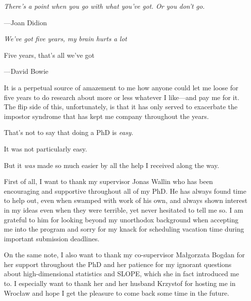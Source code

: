 \documentclass{book}
\begin{document}
\pagestyle{empty}


\cleardoublepage



\newpage
\thispagestyle{empty} %

\setlength\epigraphrule{0pt}
\setlength{}

\null
\vspace{20ex}

\epigraph{\itshape
  There’s a point when you go with what you’ve got. Or you don’t go.
}{
  ---Joan Didion
}

\cleardoublepage
\pagestyle{fancy}
\setcounter{page}{1}
\setcounter{tocdepth}{1}

{\hypersetup{hidelinks}\tableofcontents}

\newpage
{}

\epigraph{\itshape
  We've got five years, my brain hurts a lot

  Five years, that's all we've got
}{
  ---David Bowie
}

\noindent It is a perpetual source of amazement to me how anyone could let me loose for five years to do research about more or less whatever I like---and pay me for it. The flip side of this, unfortunately, is that it has only served to exacerbate the impostor syndrome that has kept me company throughout the years.

That's not to say that doing a PhD is \emph{easy}.

It was not particularly easy.

But it \emph{was} made so much easier by all the help I received along the way.

First of all, I want to thank my supervisor Jonas Wallin who has been encouraging and supportive throughout all of my PhD. He has always found time to help out, even when swamped with work of his own, and always shown interest in my ideas even when they were terrible, yet never hesitated to tell me so. I am grateful to him for looking beyond my unorthodox background when accepting me into the program and sorry for my knack for scheduling vacation time during important submission deadlines.

On the same note, I also want to thank my co-supervisor Małgorzata Bogdan for her support throughout the PhD and her patience for my ignorant questions about high-dimensional statistics and SLOPE, which she in fact introduced me to. I especially want to thank her and her husband Krzystof for hosting me in Wrocław and hope I get the pleasure to come back some time in the future.
\end{document}
